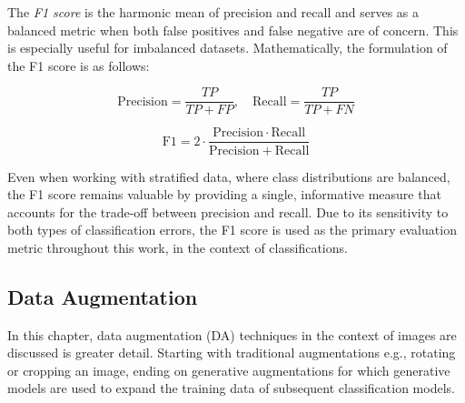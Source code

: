 The \textit{F1 score} is the harmonic mean of precision and recall and serves as a balanced metric when both false positives and false negative are of concern. This is especially useful for imbalanced datasets. Mathematically, the formulation of the F1 score is as follows: 

\begin{equation}
    \mathrm{Precision} = \frac{TP}{TP + FP}, \quad \mathrm{Recall} = \frac{TP}{TP + FN}
\end{equation}

\begin{equation}
    \mathrm{F1} = 2 \cdot \frac{\mathrm{Precision} \cdot \mathrm{Recall}}{\mathrm{Precision} + \mathrm{Recall}}
\end{equation}    

Even when working with stratified data, where class distributions are balanced, the F1 score remains valuable by providing a single, informative measure that accounts for the trade-off between precision and recall. Due to its sensitivity to both types of classification errors, the F1 score is used as the primary evaluation metric throughout this work, in the context of classifications.



\subsection[Data Augmentation - DA]{Data Augmentation}\label{theoretical_da}
In this chapter, data augmentation (DA) techniques in the context of images are discussed is greater detail. Starting with traditional augmentations e.g., rotating or cropping an image, ending on generative augmentations for which generative models are used to expand the training data of subsequent classification models.

